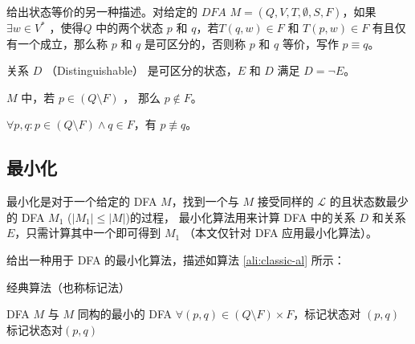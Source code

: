 \begin{definition}
    给出状态等价的另一种描述。对给定的 $DFA$ $M=(Q,V,T,\emptyset,S,F)$，如果 $\exists w \in V^*$ ，使得$Q$ 中的两个状态 $p$ 和 $q$，若$T(q,w)\in F$ 和 $T(p,w)\in F$ 有且仅有一个成立，那么称 $p$ 和 $q$ 是可区分的，否则称 $p$ 和 $q$ 等价，写作 $p \equiv q$。
\end{definition}

\begin{remark}
    关系 $D$ （Distinguishable） 是可区分的状态，$E$ 和 $D$ 满足 $D=\lnot E$。
\end{remark}

\begin{remark}
    $M$ 中，若 $p \in (Q \setminus F)$ ， 那么 $ p \notin F$。
\end{remark}

\begin{remark}
    $\forall p,q: p \in (Q \setminus F) \land q \in F$，有 $ p \not\equiv q $。
\end{remark}

\subsection{最小化}

最小化是对于一个给定的 DFA $M$，找到一个与 $M$ 接受同样的 $\mathcal{L}$ 的且状态数最少的 DFA $M_1$ ($|M_1|\leq |M|$)的过程， 最小化算法用来计算 DFA 中的关系 $D$ 和关系 $E$，只需计算其中一个即可得到 $M_1$ \cite{watson1993taxonomyb}（本文仅针对 DFA 应用最小化算法）。

给出一种用于 DFA 的最小化算法\cite{book1,zf14Min,yingjie2009describing}，描述如算法 \ref{ali:classic-al} 所示：

\begin{algorithm}
    \caption{经典算法（也称标记法\cite{zf14Min}）}\label{ali:classic-al}
    \begin{algorithmic}[1]
        \Require DFA $M$
        \Ensure 与 $M$ 同构的最小的 DFA
        \Statex
        \State $ \forall (p,q) \in (Q \setminus F) \times F $，标记状态对 $(p,q)$ 
        \Repeat
                        \State 标记状态对$(p,q)$
                    \EndIf
                \EndFor
            \EndFor
    \end{algorithmic}
\end{algorithm}

